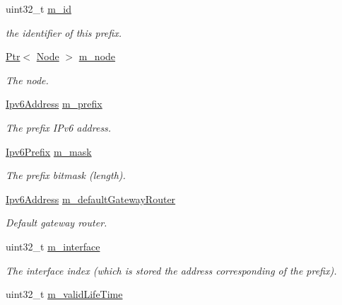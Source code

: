\begin{DoxyCompactItemize}
\item 
uint32\+\_\+t \hyperlink{classns3_1_1Ipv6AutoconfiguredPrefix_abcbef7fe5d4ebd9840756256b8c612b5}{m\+\_\+id}
\begin{DoxyCompactList}\small\item\em the identifier of this prefix. \end{DoxyCompactList}\item 
\hyperlink{classns3_1_1Ptr}{Ptr}$<$ \hyperlink{classns3_1_1Node}{Node} $>$ \hyperlink{classns3_1_1Ipv6AutoconfiguredPrefix_a3ba6ab998d069c08eea40af5b8035db8}{m\+\_\+node}
\begin{DoxyCompactList}\small\item\em The node. \end{DoxyCompactList}\item 
\hyperlink{classns3_1_1Ipv6Address}{Ipv6\+Address} \hyperlink{classns3_1_1Ipv6AutoconfiguredPrefix_a2a821cc9ffe1337f8e27bc065f157213}{m\+\_\+prefix}
\begin{DoxyCompactList}\small\item\em The prefix I\+Pv6 address. \end{DoxyCompactList}\item 
\hyperlink{classns3_1_1Ipv6Prefix}{Ipv6\+Prefix} \hyperlink{classns3_1_1Ipv6AutoconfiguredPrefix_a3a063e4dd3fbe06abf124914f5ddfd0e}{m\+\_\+mask}
\begin{DoxyCompactList}\small\item\em The prefix bitmask (length). \end{DoxyCompactList}\item 
\hyperlink{classns3_1_1Ipv6Address}{Ipv6\+Address} \hyperlink{classns3_1_1Ipv6AutoconfiguredPrefix_adda70a1fd6d52a2c1938a9f970c49e82}{m\+\_\+default\+Gateway\+Router}
\begin{DoxyCompactList}\small\item\em Default gateway router. \end{DoxyCompactList}\item 
uint32\+\_\+t \hyperlink{classns3_1_1Ipv6AutoconfiguredPrefix_ac0f477beba95f490b54ee04bcfa1baec}{m\+\_\+interface}
\begin{DoxyCompactList}\small\item\em The interface index (which is stored the address corresponding of the prefix). \end{DoxyCompactList}\item 
uint32\+\_\+t \hyperlink{classns3_1_1Ipv6AutoconfiguredPrefix_aae0f375bb88cadd1ac25a1d9834df536}{m\+\_\+valid\+Life\+Time}

\end{DoxyCompactItemize}
